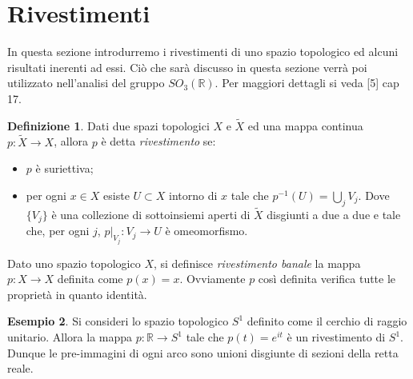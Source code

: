 \documentclass[12pt,a4paper]{report}
\theoremstyle{definition}
\newtheorem{Def}{Definizione}[chapter]
\theoremstyle{Theorem}
\theoremstyle{definition}
\newtheorem{Ex}[Def]{Esempio}
\theoremstyle{definition}
\theoremstyle{definition}
\begin{document}
\section{Rivestimenti}
In questa sezione introdurremo i rivestimenti di uno spazio topologico ed alcuni risultati inerenti ad essi. Ciò che sarà discusso in questa sezione verrà poi utilizzato nell'analisi del gruppo $SO_3(\mathbb{R})$. Per maggiori dettagli si veda [5] cap 17.
\begin{Def}
	Dati due spazi topologici $X$ e $\tilde{X}$ ed una mappa continua $p:\tilde{X}\rightarrow X$, allora $p$ è detta \textit{rivestimento} se:
	\begin{itemize}
		\item $p$ è suriettiva;
		\item per ogni $x\in X$ esiste $U\subset X$ intorno di $x$ tale che $p^{-1}(U)=\bigcup_j V_j$. Dove $\{V_j\}$ è una collezione di sottoinsiemi aperti di $\tilde{X}$ disgiunti a due a due e tale che, per ogni $j$, $p\rvert_{V_j}:V_j\rightarrow U$ è omeomorfismo. 
	\end{itemize}
\end{Def}
	Dato uno spazio topologico $X$, si definisce \textit{rivestimento banale} la mappa $p:X\rightarrow X$ definita come $p(x)=x$. Ovviamente $p$ così definita verifica tutte le proprietà in quanto identità.
\begin{Ex}
	Si consideri lo spazio topologico $S^1$ definito come il cerchio di raggio unitario. Allora la mappa $p:\mathbb{R}\rightarrow S^1$ tale che $p(t)=e^{it}$ è un rivestimento di $S^1$. Dunque le pre-immagini di ogni arco sono unioni disgiunte di sezioni della retta reale.
\end{Ex}
\begin{center}
	
\end{center}
\end{document}

